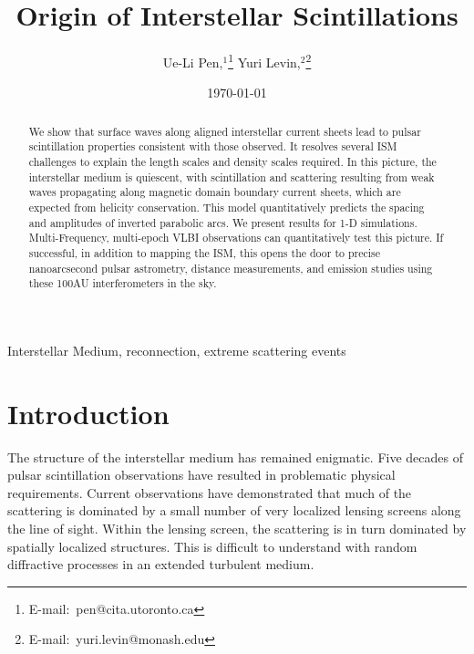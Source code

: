 \documentclass[useAMS,usenatbib]{mn2e}
\title[Interstellar Plasma Scattering]{
Origin of Interstellar Scintillations
}
\author[Pen and Levin]{Ue-Li
  Pen,$^{1}$\thanks{E-mail:\ pen@cita.utoronto.ca}
Yuri Levin,$^2$\thanks{E-mail:\ yuri.levin@monash.edu}
}
\begin{document}
\date{\today}

\pagerange{\pageref{firstpage}--\pageref{lastpage}} 

\maketitle
\label{firstpage}
\begin{abstract}

We show that surface waves along aligned interstellar current sheets
lead to pulsar scintillation properties consistent with those
observed.  It resolves several ISM challenges to explain the length
scales and density scales required.  In this picture, the interstellar
medium is quiescent, with scintillation and scattering resulting from
weak waves propagating along magnetic domain boundary current sheets,
which are expected from helicity conservation.  This model
quantitatively predicts the spacing and amplitudes of inverted
parabolic arcs.  We present results for 1-D simulations.
Multi-Frequency, multi-epoch VLBI observations can quantitatively test
this picture.  If successful, in addition to mapping the ISM, this
opens the door to precise nanoarcsecond pulsar astrometry, distance
measurements, and emission studies using these 100AU interferometers
in the sky.

\end{abstract}
\begin{keywords}
Interstellar Medium, reconnection, extreme scattering events
\end{keywords}

\newcommand{\be}{\begin{eqnarray}}
\newcommand{\ee}{\end{eqnarray}}
\newcommand{\beq}{\begin{equation}}
\newcommand{\eeq}{\end{equation}}

\section{Introduction}

The structure of the interstellar medium has remained enigmatic. Five
decades of pulsar scintillation observations\cite{1968Natur.218..920S}
have resulted in problematic physical requirements.  Current
observations have demonstrated that much of the scattering is
dominated by a small number of very localized lensing
screens\citep{2010ApJ...708..232B} along the line of sight.  Within
the lensing screen, the scattering is in turn dominated by spatially
localized structures.  This is difficult to understand with random diffractive
processes in an extended turbulent medium.
\end{document}
